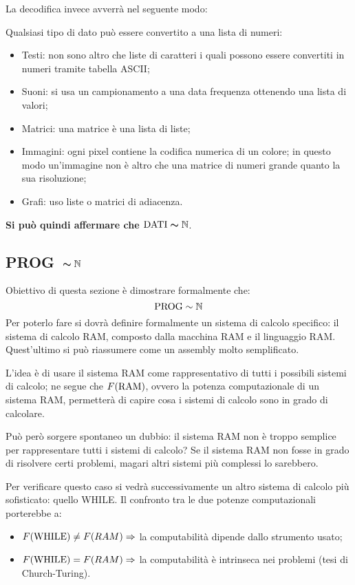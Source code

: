 La decodifica invece avverrà nel seguente modo:
\begin{figure}[H]
    \centering
    
\end{figure}

Qualsiasi tipo di dato può essere convertito a una lista di numeri:
\begin{itemize}
    \item Testi: non sono altro che liste di caratteri i quali possono essere convertiti
        in numeri tramite tabella ASCII;
    \item Suoni: si usa un campionamento a una data frequenza ottenendo una lista di
        valori;
    \item Matrici: una matrice è una lista di liste;
    \item Immagini: ogni pixel contiene la codifica numerica di un colore; in questo modo
    un'immagine non è altro che una matrice di numeri grande quanto la sua risoluzione;
    \item Grafi: uso liste o matrici di adiacenza.
\end{itemize}

\textbf{Si può quindi affermare che $\bm{\text{DATI}\sim\mathbb{N}}$}.

\subsection{\texorpdfstring{PROG\ $\bm{\sim\mathbb{N}}$}{PROG~N}}
Obiettivo di questa sezione è dimostrare formalmente che:
$$ \text{PROG} \sim \mathbb{N} $$
Per poterlo fare si dovrà definire formalmente un sistema di calcolo specifico: il sistema 
di calcolo RAM, composto dalla macchina RAM e il linguaggio RAM. Quest'ultimo si può 
riassumere come un assembly molto semplificato.

L'idea è di usare il sistema RAM come rappresentativo di tutti i possibili sistemi di calcolo;
ne segue che $F(\text{RAM})$, ovvero la potenza computazionale di un sistema RAM, permetterà
di capire cosa i sistemi di calcolo sono in grado di calcolare.

Può però sorgere spontaneo un dubbio: il sistema RAM non è troppo semplice per rappresentare
tutti i sistemi di calcolo? Se il sistema RAM non fosse in grado di risolvere
certi problemi, magari altri sistemi più complessi lo sarebbero.

Per verificare questo caso si vedrà successivamente un altro sistema di calcolo più
sofisticato: quello WHILE. Il confronto tra le due potenze computazionali porterebbe a:
\begin{itemize}
    \item $F(\text{WHILE})\neq F(RAM) \Rightarrow$ la computabilità dipende dallo strumento usato;
    \item $F(\text{WHILE})=F(RAM) \Rightarrow$ la computabilità è intrinseca nei problemi 
        (tesi di Church-Turing).
\end{itemize}

